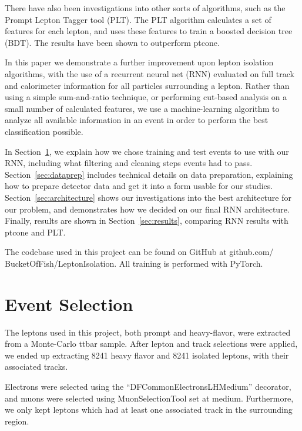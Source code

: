 \documentclass[preprint,12pt]{elsarticle}
\begin{document}
There have also been investigations into other sorts of algorithms, such as the Prompt Lepton Tagger tool (PLT). The PLT algorithm calculates a set of features for each lepton, and uses these features to train a boosted decision tree (BDT). The results have been shown to outperform ptcone.


In this paper we demonstrate a further improvement upon lepton isolation algorithms, with the use of a recurrent neural net (RNN) evaluated on full track and calorimeter information for all particles surrounding a lepton. Rather than using a simple sum-and-ratio technique, or performing cut-based analysis on a small number of calculated features, we use a machine-learning algorithm to analyze all available information in an event in order to perform the best classification possible.

In Section~\ref{sec:selection}, we explain how we chose training and test events to use with our RNN, including what filtering and cleaning steps events had to pass. Section~\ref{sec:dataprep} includes technical details on data preparation, explaining how to prepare detector data and get it into a form usable for our studies. Section~\ref{sec:architecture} shows our investigations into the best architecture for our problem, and demonstrates how we decided on our final RNN architecture. Finally, results are shown in Section~\ref{sec:results}, comparing RNN results with ptcone and PLT.

The codebase used in this project can be found on GitHub at github.com/ BucketOfFish/LeptonIsolation. All training is performed with PyTorch.

\section{Event Selection}\label{sec:selection}

The leptons used in this project, both prompt and heavy-flavor, were extracted from a Monte-Carlo ttbar sample.
After lepton and track selections were applied, we ended up extracting 8241 heavy flavor and 8241 isolated leptons, with their associated tracks.

Electrons were selected using the “DFCommonElectronsLHMedium” decorator, and muons were selected using MuonSelectionTool set at medium. Furthermore, we only kept leptons which had at least one associated track in the surrounding region.
\end{document}
